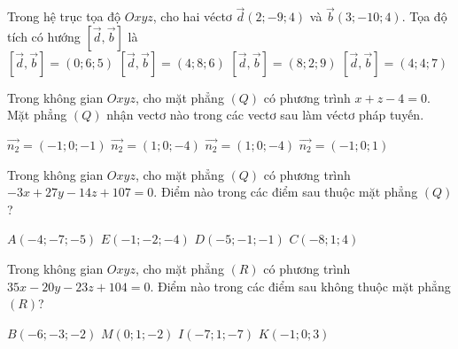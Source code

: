 \documentclass[12pt,a4paper]{article}
\begin{document}
\begin{ex}
 Trong hệ trục tọa độ ${Oxyz}$, cho hai véctơ $\overrightarrow{d}(2;-9;4)$ và $\overrightarrow{b}(3;-10;4)$. Tọa độ tích có hướng $\left[\overrightarrow{d},\overrightarrow{b}\right]$ là\\ 
\choice
{ $\left[\overrightarrow{d},\overrightarrow{b}\right]=(0;6;5)$ }
   { $\left[\overrightarrow{d},\overrightarrow{b}\right]=(4;8;6)$ }
     { $\left[\overrightarrow{d},\overrightarrow{b}\right]=(8;2;9)$ }
    { \True $\left[\overrightarrow{d},\overrightarrow{b}\right]= (4;4;7)$ }
\end{ex}

\begin{ex}
 Trong không gian ${Oxyz}$, cho mặt phẳng ${(Q)}$ có phương trình $x + z - 4=0$. Mặt phẳng ${(Q)}$ nhận vectơ nào trong các vectơ sau làm véctơ pháp tuyến.
 
\choice
{ \True $\overrightarrow{n_2}=(-1;0;-1)$ }
   { $\overrightarrow{n_2}=(1;0;-4)$ }
     { $\overrightarrow{n_2}=(1;0;-4)$ }
    { $\overrightarrow{n_2}=(-1;0;1)$ }
\end{ex}

\begin{ex}
 Trong không gian ${Oxyz}$, cho mặt phẳng ${(Q)}$ có phương trình $- 3 x + 27 y - 14 z + 107=0$. Điểm nào trong các điểm sau thuộc mặt phẳng ${(Q)}$?
 
\choice
{ \True $A(-4;-7;-5)$ }
   { $E(-1;-2;-4)$ }
     { $D(-5;-1;-1)$ }
    { $C(-8;1;4)$ }
\end{ex}

\begin{ex}
 Trong không gian ${Oxyz}$, cho mặt phẳng ${(R)}$ có phương trình $35 x - 20 y - 23 z + 104=0$. Điểm nào trong các điểm sau không thuộc mặt phẳng ${(R)}$?
 
\choice
{ $B(-6;-3;-2)$ }
   { \True $M(0;1;-2)$ }
     { $I(-7;1;-7)$ }
    { $K(-1;0;3)$ }
\end{ex}
\end{document}
